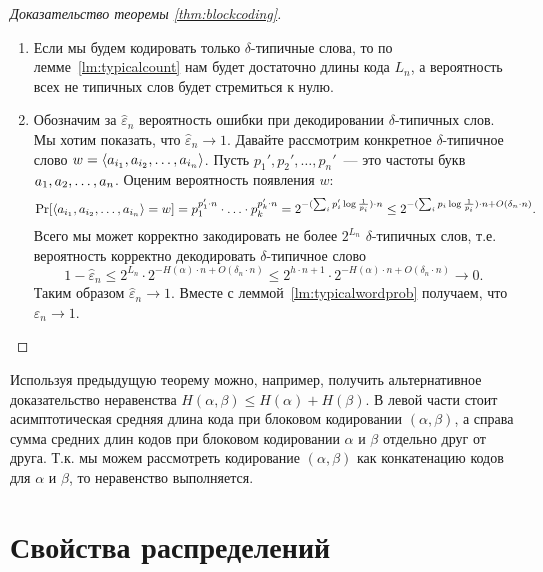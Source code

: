 \documentclass[12pt]{article}
\begin{document}
\begin{proof}[Доказательство теоремы \ref{thm:blockcoding}] \mbox{}
    \begin{enumerate} 
    \item Если мы будем кодировать только $\delta$-типич\-ные слова, то по
    лемме~\ref{lm:typicalcount} нам будет достаточно длины кода $L_n$, а
    вероятность всех не типичных слов будет стремиться к нулю.

    \item Обозначим за $\hat\varepsilon_n$ вероятность ошибки при декодировании
         $\delta$-типичных слов.
        Мы хотим показать, что $\hat\varepsilon_n\to1$.  
        Давайте рассмотрим конкретное $\delta$-типичное слово
        $w=\langle{a}_{{i}_1},{a}_{{i}_2},\dotsc,{a}_{{i}_{n}}\rangle$. Пусть $p_1', p_2',\dotsc,p_n'$~---
        это частоты букв ${a}_1,{a}_2,\dotsc,{a}_{n}$.
        Оценим вероятность появления $w$:
        \[
            \Pr[\langle{a}_{{i}_1},{a}_{{i}_2},\dotsc,{a}_{{i}_{n}}\rangle = w] = 
            p_1^{p_1'\cdot n} \cdot \dotsc \cdot p_k^{p_k'\cdot n} 
            =   2^{-(\sum_i p_i'\log\frac{1}{p_i})\cdot n}
            \le 2^{-(\sum_i p_i\log\frac{1}{p_i})\cdot n + O(\delta_n\cdot n)}.
        \]
        Всего мы может корректно закодировать не более $2^{L_n}$
        $\delta$-типичных слов, т.е. вероятность корректно декодировать
        $\delta$-типичное слово
        \[
            1 - \hat\varepsilon_n \le 2^{L_n}\cdot 2^{-H(\alpha)\cdot n + O(\delta_n\cdot n)} \le
            2^{h\cdot n + 1}\cdot 2^{-H(\alpha)\cdot n + O(\delta_n\cdot n)} 
            \to 0.
        \]
        Таким образом $\hat\varepsilon_n\to1$. Вместе с
        леммой~\ref{lm:typicalwordprob} получаем, что $\varepsilon_n\to1$.

    \end{enumerate}
\end{proof}
\begin{remark}
    Используя предыдущую теорему можно, например, получить альтернативное
    доказательство неравенства $H(\alpha,\beta)\le H(\alpha) + H(\beta).$ В
    левой части стоит асимптотическая средняя длина кода при блоковом
    кодировании $(\alpha,\beta)$, а справа сумма средних длин кодов
    при блоковом кодировании $\alpha$ и $\beta$ отдельно друг от друга. Т.к. мы
    можем рассмотреть кодирование $(\alpha,\beta)$ как конкатенацию кодов для
    $\alpha$ и $\beta$, то неравенство выполняется.
\end{remark}

\section{Свойства распределений}
\end{document}
